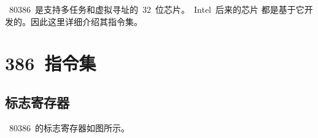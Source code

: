 ﻿%
%


~80386~是支持多任务和虚拟寻址的~32~位芯片。~Intel~后来的芯片
都是基于它开发的。因此这里详细介绍其指令集。

\section{386~指令集}

\subsection{标志寄存器}

~80386~的标志寄存器如图所示。
